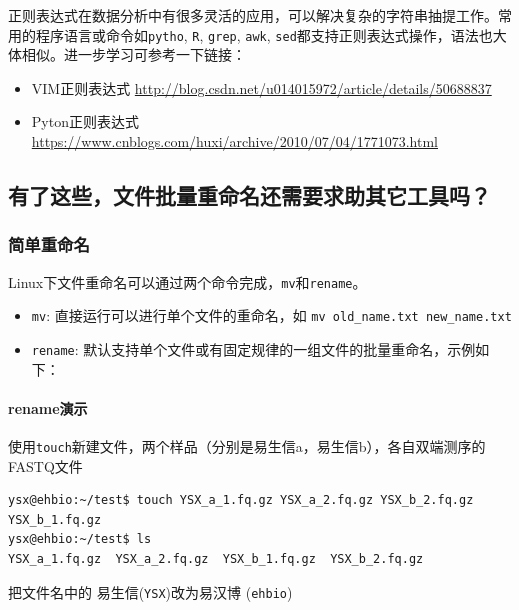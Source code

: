 \documentclass[]{article}
\providecommand{\tightlist}{%
  \setlength{\itemsep}{0pt}\setlength{\parskip}{0pt}}
\numberwithin{figure}{section}
\numberwithin{table}{section}
\begin{document}
正则表达式在数据分析中有很多灵活的应用，可以解决复杂的字符串抽提工作。常用的程序语言或命令如\texttt{pytho}, \texttt{R}, \texttt{grep}, \texttt{awk}, \texttt{sed}都支持正则表达式操作，语法也大体相似。进一步学习可参考一下链接：

\begin{itemize}
\tightlist
\item
  VIM正则表达式 \url{http://blog.csdn.net/u014015972/article/details/50688837}
\item
  Pyton正则表达式 \url{https://www.cnblogs.com/huxi/archive/2010/07/04/1771073.html}
\end{itemize}

\hypertarget{rename_all}{%
\subsection{有了这些，文件批量重命名还需要求助其它工具吗？}\label{rename_all}}

\hypertarget{rename_simple}{%
\subsubsection{简单重命名}\label{rename_simple}}

Linux下文件重命名可以通过两个命令完成，\texttt{mv}和\texttt{rename}。

\begin{itemize}
\tightlist
\item
  \texttt{mv}: 直接运行可以进行单个文件的重命名，如 \texttt{mv\ old\_name.txt\ new\_name.txt}
\item
  \texttt{rename}: 默认支持单个文件或有固定规律的一组文件的批量重命名，示例如下：
\end{itemize}

\hypertarget{rename_simple1}{%
\paragraph{rename演示}\label{rename_simple1}}

使用\texttt{touch}新建文件，两个样品（分别是易生信a，易生信b），各自双端测序的FASTQ文件

\begin{verbatim}
ysx@ehbio:~/test$ touch YSX_a_1.fq.gz YSX_a_2.fq.gz YSX_b_2.fq.gz YSX_b_1.fq.gz
ysx@ehbio:~/test$ ls
YSX_a_1.fq.gz  YSX_a_2.fq.gz  YSX_b_1.fq.gz  YSX_b_2.fq.gz
\end{verbatim}

把文件名中的 易生信(\texttt{YSX})改为易汉博 (\texttt{ehbio})
\end{document}
